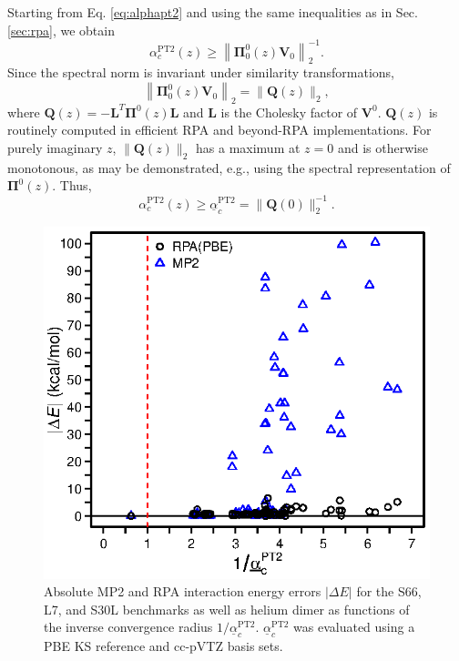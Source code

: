 \documentclass[journal=jctcce,manuscript=article]{achemso}
\begin{document}
Starting from Eq. \eqref{eq:alphapt2} and using the same inequalities as in
Sec. \ref{sec:rpa}, we obtain
\begin{equation}
  \alpha_c^{\text{PT2}}(z) \geq \left\| \boldsymbol{\Pi}_0^0(z)
    \mathbf{V}_0 \right\|_2^{-1}.
\end{equation}
Since the spectral norm is invariant under similarity transformations,
\begin{equation}
  \left\| \boldsymbol{\Pi}_0^0(z)
    \mathbf{V}_0 \right\|_2 = \| \mathbf{Q}(z) \|_2,
\end{equation}
where $\mathbf{Q}(z) = -\mathbf{L}^T \boldsymbol{\Pi}^0(z)
\mathbf{L}$ and $\mathbf{L}$ is the Cholesky factor of
$\mathbf{V}^0$. $\mathbf{Q}(z)$ is routinely computed in efficient RPA and beyond-RPA
implementations.\cite{Eshuis10JChemPhys132p234114,Burow14JChemTheoryComput10p180,
doi:10.1021/acs.jctc.8b00777}
For purely imaginary $z$, $\|\mathbf{Q}(z) \|_2$ has a maximum at $z=0$ and
is otherwise monotonous, as may be demonstrated, e.g., using the spectral
representation of $\boldsymbol{\Pi}^0(z)$. Thus, 
\begin{equation}
   \alpha_c^{\text{PT2}}(z) \geq \underline{\alpha}_c^{\text{PT2}} = \|
   \mathbf{Q}(0) \|_2^{-1}.
\end{equation}

\begin{figure}[hbpt]
  \centering
  \includegraphics{eig_q_mp2.eps}
  \caption{Absolute MP2 and RPA interaction energy errors $|\Delta E|$
    for the 
    S66,\cite{doi:10.1021/ct2002946,doi:10.1021/ct200523a}
    L7,\cite{doi:10.1021/ct400036b} and S30L\cite{Sure15JChemTheoryComput}
    benchmarks as well as helium dimer
    as functions of the inverse convergence radius
    $1/\underline{\alpha}_c^{\text{PT2}}$. $\underline{\alpha}_c^{\text{PT2}}$
    was evaluated using a PBE KS reference and cc-pVTZ basis
    sets.}
  \label{fig:eig_q_mp2}
\end{figure}
\end{document}
